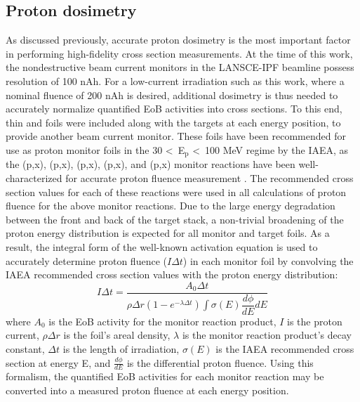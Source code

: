 \documentclass[3p]{elsarticle}
\newcommand{\pp}[1]{\left( #1\right)}
\newcommand{\comment}[1]{\todo[color=blue!20!white,inline]{ASV: #1}}
\begin{document}


\subsection{Proton dosimetry}\label{sec:dosimetry}


As discussed previously, accurate proton dosimetry is the most important factor in performing high-fidelity cross section measurements.
At the time of this work, the nondestructive beam current monitors in the LANSCE-IPF beamline possess resolution of 100 nAh.
For a low-current irradiation such as this work, where a nominal fluence of 200 nAh is desired, additional dosimetry is thus needed to accurately normalize quantified EoB activities into cross sections.
To this end, thin  and  foils were included along with the  targets at each energy position, to provide another beam current monitor.
These foils have been recommended for use as proton monitor foils in the 30 \textless\ E$_\text{p}$ \textless\ 100 MeV regime by the IAEA, as the (p,x), (p,x), (p,x), (p,x), and (p,x) monitor reactions have been well-characterized for accurate proton fluence measurement \cite{gul2001charged}.
The recommended cross section values for each of these reactions were used in all calculations of proton fluence for the above monitor reactions.
Due to the large energy degradation between the front and  back of the target stack, a non-trivial broadening of the proton energy distribution is expected for all monitor and target foils.
As a result, the integral form of the well-known activation equation is used to accurately determine proton fluence ($I \Delta t $) in each monitor foil by convolving the IAEA recommended cross section values with the proton energy distribution:
\begin{equation}
I \Delta t = \dfrac{A_0 \Delta t}{\rho \Delta r \pp{1-e^{-\lambda \Delta t}} \int \sigma\pp{E} \dfrac{d\phi}{dE} dE}
\end{equation}
where $A_0$ is the EoB activity for the monitor reaction product, $I$ is the proton current, $\rho \Delta r$ is the foil's areal density, $\lambda$ is the monitor reaction product's decay constant, $\Delta t$ is the length of irradiation, $\sigma\pp{E}$ is the IAEA recommended cross section at energy E, and $\frac{d\phi}{dE}$ is the differential proton fluence.
Using this formalism, the quantified EoB activities for each monitor reaction may be converted into a measured proton fluence at each energy position.
\end{document}
